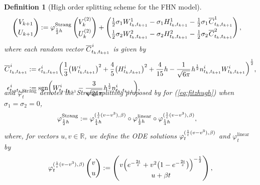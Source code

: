 \documentclass[sn-mathphys-num]{sn-jnl}%
\newtheorem{definition}{Definition}%
\newcommand{\R}{\mathbb{R}}
\newcommand{\m}{\hspace{0.25mm}}
\newcommand{\sgn}{\mathrm{sgn}}
\begin{document}
\begin{definition}[High order splitting scheme for the FHN model]
\begin{align}
\begin{pmatrix}V_{k+1}\\[3pt] U_{k+1}\end{pmatrix} & := \varphi_{\frac{1}{2}h}^{\text{Strang}}\begin{pmatrix}V_k^{(2)}\\[3pt] U_k^{(2)}\end{pmatrix} + \begin{pmatrix}\frac{1}{2}\sigma_1 W_{t_k, t_{k+1}}^{1} - \sigma_1 H_{t_k, t_{k+1}}^{1} - \frac{1}{2} \sigma_1\m\overline{C}_{t_k, t_{k+1}}^{1}\\[3pt] \frac{1}{2}\sigma_2 W_{t_k, t_{k+1}}^{2} - \sigma_2 H_{t_k, t_{k+1}}^{2} - \frac{1}{2}\sigma_2\m \overline{C}_{t_k, t_{k+1}}^{2}\end{pmatrix},\label{eq:fitzhugh_splitting}
\end{align}
where each random vector $\overline{C}_{t_k, t_{k+1}}^{\m i}$ is given by\vspace{-2mm}
\begin{align*}
\overline{C}_{t_k, t_{k+1}}^{\m i} & := \epsilon_{t_k, t_{k+1}}^i\bigg(\frac{1}{3}\big(W_{t_k, t_{k+1}}^i\big)^2 + \frac{4}{5}\big(H_{t_k, t_{k+1}}^i\big)^2 + \frac{4}{15}h - \frac{1}{\sqrt{6\pi}}\m h^\frac{1}{2} n_{t_k, t_{k+1}}^i W_{t_k, t_{k+1}}^i\bigg)^\frac{1}{2},\\
\epsilon_{t_k, t_{k+1}}^{\m i} & := \sgn\bigg(W_{t_k, t_{k+1}}^i - \frac{3}{\sqrt{24\pi}}\m h^\frac{1}{2} n_{t_k, t_{k+1}}^i\bigg),\\[-20pt]
\end{align*}
and $\varphi_t^{\text{Strang}}$ denotes the Strang splitting proposed by \cite{buckwar2022splitting} for (\ref{eq:fitzhugh}) when $\sigma_1 = \sigma_2 = 0$,
\begin{align*}
\varphi_{\frac{1}{2}h}^{\text{Strang}} & := \varphi_{\frac{1}{4}h}^{(\frac{1}{\varepsilon}(v-v^3),\m \beta)}\circ\varphi_{\frac{1}{2}h}^{\text{linear}}\circ\varphi_{\frac{1}{4}h}^{(\frac{1}{\varepsilon}(v-v^3),\m \beta)},
\end{align*}
where, for vectors $u, v\in\R$, we define the ODE solutions $\varphi_t^{(\frac{1}{\varepsilon}(v-v^3),\m \beta)}$ and $\varphi_t^{\text{linear}}$ by
\begin{align*}
\varphi_t^{(\frac{1}{\varepsilon}(v-v^3),\m \beta)}\begin{pmatrix}v\\[3pt] u\end{pmatrix} & := \begin{pmatrix}v \Big(e^{-\frac{2t}{\varepsilon}} + v^2\big(1 - e^{-\frac{2t}{\varepsilon}}\big)\Big)^{-\frac{1}{2}}\\ u + \beta t\end{pmatrix},\\

\end{align*}
\end{definition}
\end{document}
